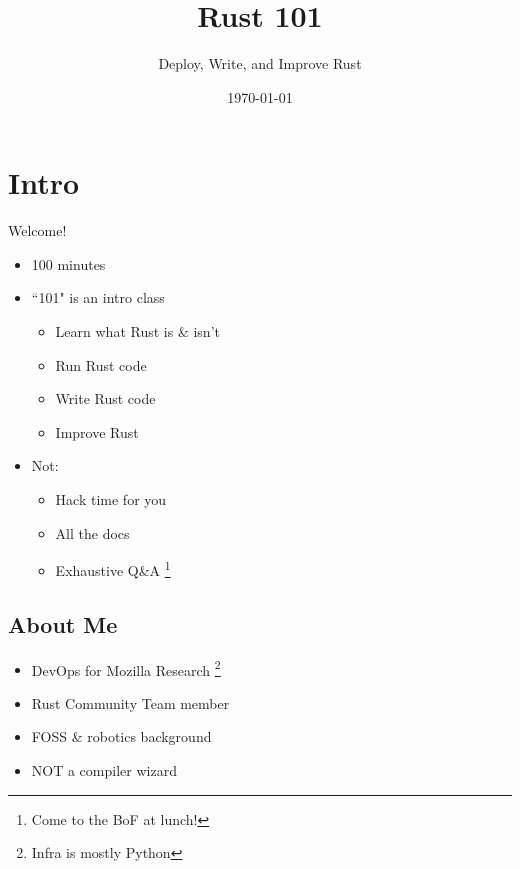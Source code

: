 \documentclass[50pt]{beamer}
\title[Rust 101]{Rust 101}
\subtitle{Deploy, Write, and Improve Rust}
\author{\name}
\date{\today}
\begin{document}
\begin{frame}
\titlepage
\end{frame}

\section{Intro}

    \begin{frame}
        Welcome!
         \begin{itemize}
            \item 100 minutes
            \item ``101" is an intro class
            \begin{itemize}
                \item Learn what Rust is \& isn't
                \item Run Rust code
                \item Write Rust code
                \item Improve Rust
            \end{itemize}
            \item Not:
            \begin{itemize}
                \item Hack time for you
                \item All the docs
                \item Exhaustive Q\&A \footnote{Come to the BoF at lunch!}
            \end{itemize}
        \end{itemize}
    \end{frame}

    \subsection{About Me}

    \begin{frame}
        \begin{itemize}
            \item DevOps for Mozilla Research \footnote{Infra is mostly Python}
            \item Rust Community Team member
            \item FOSS \& robotics background
            \item NOT a compiler wizard
        \end{itemize}
    \end{frame}
\end{document}
